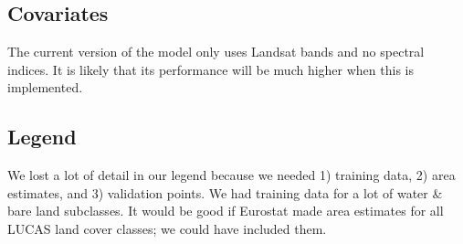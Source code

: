     \subsection{Covariates}
        The current version of the model only uses Landsat bands and no spectral indices. It is likely that its performance will be much higher when this is implemented. 

    \subsection{Legend}
        We lost a lot of detail in our legend because we needed 1) training data, 2) area estimates, and 3) validation points. We had training data for a lot of water \& bare land subclasses. It would be good if Eurostat made area estimates for all LUCAS land cover classes; we could have included them.